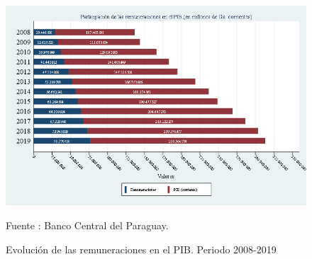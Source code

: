 \begin{figure}[H]
\begin{center}
                    \caption{Evolución de las remuneraciones en el PIB. Periodo 2008-2019}
                    \includegraphics[scale=0.55]{BCP_particRemuneraciones.png}
                                    \item \footnotesize Fuente : Banco Central del Paraguay.        %
                    \end{center}
\end{figure}
